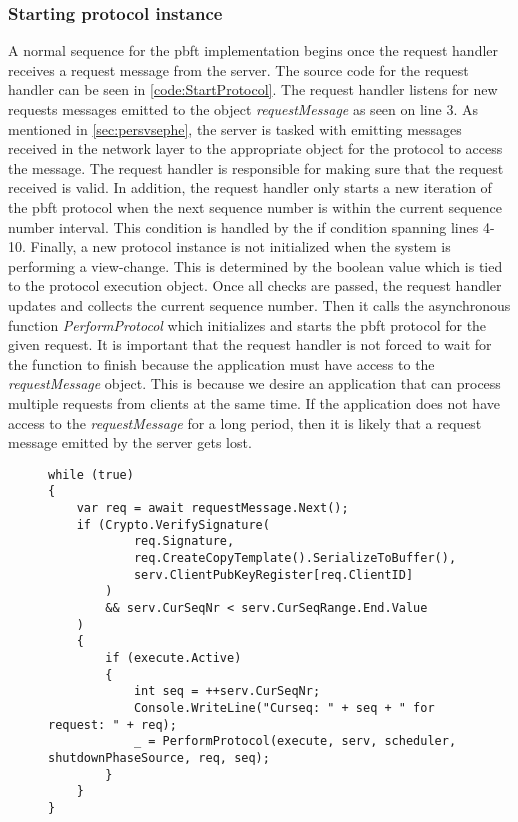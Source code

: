 \subsubsection{Starting protocol instance}
A normal sequence for the \ac{pbft} implementation begins once the request handler receives a request message from the server. The source code for the request handler can be seen in \autoref{code:StartProtocol}. The request handler listens for new requests messages emitted to the  object \emph{requestMessage} as seen on line 3. As mentioned in \autoref{sec:persvsephe}, the server is tasked with emitting messages received in the network layer to the appropriate  object for the protocol to access the message. The request handler is responsible for making sure that the request received is valid. In addition, the request handler only starts a new iteration of the \ac{pbft} protocol when the next sequence number is within the current sequence number interval. This condition is handled by the if condition spanning lines 4-10. Finally, a new protocol instance is not initialized when the system is performing a view-change. This is determined by the boolean value  which is tied to the protocol execution object. Once all checks are passed, the request handler updates and collects the current sequence number. Then it calls the asynchronous  function \emph{PerformProtocol} which initializes and starts the \ac{pbft} protocol for the given request. It is important that the request handler is not forced to wait for the  function to finish because the application must have access to the \emph{requestMessage}  object. This is because we desire an application that can process multiple requests from clients at the same time. If the application does not have access to the \emph{requestMessage} for a long period, then it is likely that a request message emitted by the server gets lost.

\begin{figure}[H]
	\centering
	\begin{lstlisting}[label = code:StartProtocol, caption=Code section for the request handler, captionpos = b, basicstyle=\scriptsize]
while (true)
{
    var req = await requestMessage.Next();
    if (Crypto.VerifySignature(
            req.Signature, 
            req.CreateCopyTemplate().SerializeToBuffer(), 
            serv.ClientPubKeyRegister[req.ClientID]
        ) 
        && serv.CurSeqNr < serv.CurSeqRange.End.Value
    )
    {
        if (execute.Active)
        {
            int seq = ++serv.CurSeqNr;
            Console.WriteLine("Curseq: " + seq + " for request: " + req);
            _ = PerformProtocol(execute, serv, scheduler, shutdownPhaseSource, req, seq);
        }
    }
}
	\end{lstlisting}
\end{figure}

